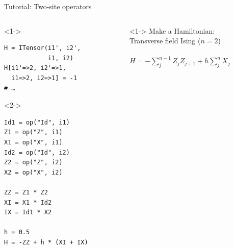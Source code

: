\begin{frame}[fragile]{Tutorial: Two-site operators}

\begin{columns}

\begin{column}{4.5cm}

\begin{onlyenv}<1->
\begin{lstlisting}[language=JuliaLocal, style=julia, basicstyle=\scriptsize\ttfamily]
H = ITensor(i1', i2',
            i1, i2)
H[i1'=>2, i2'=>1,
  i1=>2, i2=>1] = -1
# …
\end{lstlisting}
\end{onlyenv}

\begin{onlyenv}<2->
\begin{lstlisting}[language=JuliaLocal, style=julia, basicstyle=\scriptsize\ttfamily]
Id1 = op("Id", i1)
Z1 = op("Z", i1)
X1 = op("X", i1)
Id2 = op("Id", i2)
Z2 = op("Z", i2)
X2 = op("X", i2)

ZZ = Z1 * Z2
XI = X1 * Id2
IX = Id1 * X2

h = 0.5
H = -ZZ + h * (XI + IX)
\end{lstlisting}
\end{onlyenv}

\end{column}

\begin{column}{5.5cm}

\begin{onlyenv}<1->
Make a Hamiltonian: \\
Transverse field Ising ($n=2$) \\
~\\
$H = -\sum_j^{n-1} Z_j Z_{j+1} + h \sum_j^n X_j$
\end{onlyenv}



\end{column}
\end{columns}
\end{frame}
